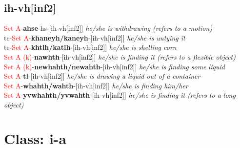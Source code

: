 \documentclass[oneside,openany]{book}%
\begin{document}
\subsection*{ih-vh[inf2]}%
\textcolor{Red}{Set A}{-}\textbf{ahse}{-}hs{-}[ih-vh[inf2]] \textit{ he/she is withdrawing (refers to a motion)} \\%
te{-}\textcolor{Red}{Set A}{-}\textbf{khaneyh/kaneyh}{-}[ih-vh[inf2]] \textit{ he/she is untying it} \\%
te{-}\textcolor{Red}{Set A}{-}\textbf{khtlh/katlh}{-}[ih-vh[inf2]] \textit{ he/she is shelling corn} \\%
\textcolor{Red}{Set A (k)}{-}\textbf{nawhth}{-}[ih-vh[inf2]] \textit{ he/she is finding it (refers to a flexible object)} \\%
\textcolor{Red}{Set A (k)}{-}\textbf{newhahth/newahth}{-}[ih-vh[inf2]] \textit{ he/she is finding some liquid} \\%
\textcolor{Red}{Set A}{-}\textbf{tl}{-}[ih-vh[inf2]] \textit{ he/she is drawing a liquid out of a container} \\%
\textcolor{Red}{Set A}{-}\textbf{whahth/wahth}{-}[ih-vh[inf2]] \textit{ he/she is finding him/her} \\%
\textcolor{Red}{Set A}{-}\textbf{yvwhahth/yvwahth}{-}[ih-vh[inf2]] \textit{ he/she is finding it (refers to a long object)} \\%
\vspace{1em}%
\needspace{3in}%
\section*{Class: i-a}%
%
\needspace{1in}%
\end{document}
